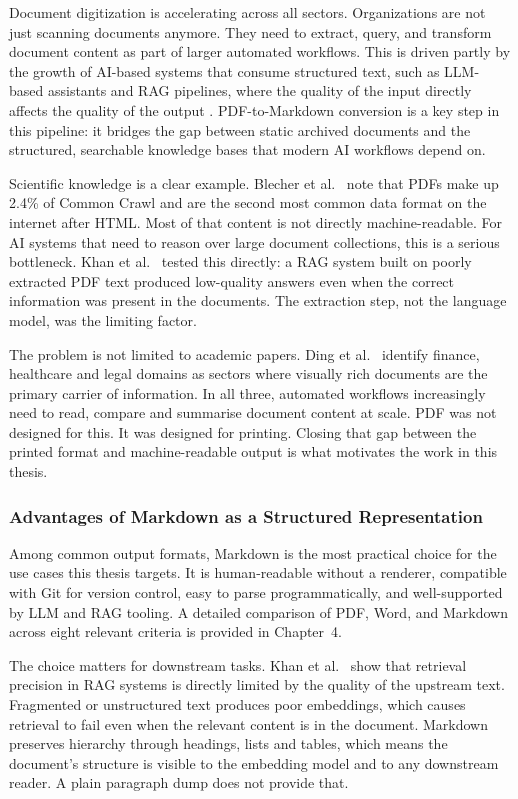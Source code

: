 \documentclass[12pt]{article}
\begin{document}
Document digitization is accelerating across all sectors. Organizations are
not just scanning documents anymore. They need to extract, query, and
transform document content as part of larger automated workflows. This is
driven partly by the growth of AI-based systems that consume structured text,
such as LLM-based assistants and RAG pipelines, where the quality of the
input directly affects the quality of the output \cite{khan2024}.
PDF-to-Markdown conversion is a key step in this pipeline: it bridges the
gap between static archived documents and the structured, searchable
knowledge bases that modern AI workflows depend on.

Scientific knowledge is a clear example. Blecher et al.\ \cite{blecher2023}
note that PDFs make up 2.4\% of Common Crawl and are the second most
common data format on the internet after HTML. Most of that content is
not directly machine-readable. For AI systems that need to reason over large
document collections, this is a serious bottleneck. Khan et al.\ \cite{khan2024}
tested this directly: a RAG system built on poorly extracted PDF text produced
low-quality answers even when the correct information was present in the
documents. The extraction step, not the language model, was the limiting factor.

The problem is not limited to academic papers. Ding et al.\ \cite{ding2026}
identify finance, healthcare and legal domains as sectors where visually rich
documents are the primary carrier of information. In all three, automated
workflows increasingly need to read, compare and summarise document content
at scale. PDF was not designed for this. It was designed for printing.
Closing that gap between the printed format and machine-readable output is
what motivates the work in this thesis.

\subsubsection{Advantages of Markdown as a Structured Representation}

Among common output formats, Markdown is the most practical choice for the
use cases this thesis targets. It is human-readable without a renderer,
compatible with Git for version control, easy to parse programmatically, and
well-supported by LLM and RAG tooling. A detailed comparison of PDF, Word,
and Markdown across eight relevant criteria is provided in Chapter~4.

The choice matters for downstream tasks. Khan et al.\ \cite{khan2024} show
that retrieval precision in RAG systems is directly limited by the quality of
the upstream text. Fragmented or unstructured text produces poor embeddings,
which causes retrieval to fail even when the relevant content is in the document.
Markdown preserves hierarchy through headings, lists and tables, which means
the document's structure is visible to the embedding model and to any downstream
reader. A plain paragraph dump does not provide that.
\end{document}
